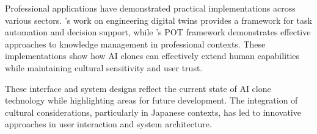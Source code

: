 Professional applications have demonstrated practical implementations across various sectors. \citet{smith2022digital}'s work on engineering digital twins provides a framework for task automation and decision support, while \citet{mandischer2024pot}'s POT framework demonstrates effective approaches to knowledge management in professional contexts. These implementations show how AI clones can effectively extend human capabilities while maintaining cultural sensitivity and user trust.

These interface and system designs reflect the current state of AI clone technology while highlighting areas for future development. The integration of cultural considerations, particularly in Japanese contexts, has led to innovative approaches in user interaction and system architecture.
